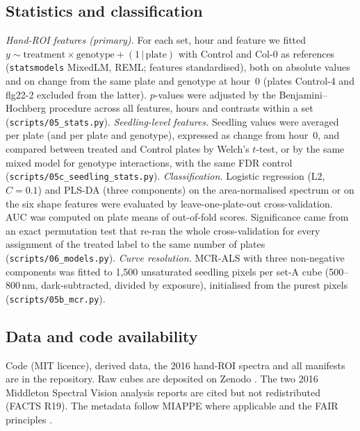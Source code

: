 \subsection{Statistics and classification}
\emph{Hand-ROI features (primary).} For each set, hour and feature we fitted
$y \sim \mathrm{treatment}\times\mathrm{genotype} + (1\,|\,\mathrm{plate})$ with Control and Col-0 as
references (\texttt{statsmodels} MixedLM, REML; features standardised), both on absolute values and
on change from the same plate and genotype at hour~0 (plates Control-4 and flg22-2 excluded from
the latter). $p$-values were adjusted by the Benjamini--Hochberg procedure across all features,
hours and contrasts within a set \citep{benjamini1995} (\texttt{scripts/05\_stats.py}).
\emph{Seedling-level features.} Seedling values were averaged per plate (and per plate and
genotype), expressed as change from hour~0, and compared between treated and Control plates by
Welch's $t$-test, or by the same mixed model for genotype interactions, with the same FDR control
(\texttt{scripts/05c\_seedling\_stats.py}).
\emph{Classification.} Logistic regression (L2, $C=0.1$) and PLS-DA (three components) on the
area-normalised spectrum or on the six shape features were evaluated by leave-one-plate-out
cross-validation. AUC was computed on plate means of out-of-fold scores. Significance came from an
exact permutation test that re-ran the whole cross-validation for every assignment of the treated
label to the same number of plates (\texttt{scripts/06\_models.py}).
\emph{Curve resolution.} MCR-ALS with three non-negative components was fitted to 1,500 unsaturated
seedling pixels per set-A cube (500--800\,nm, dark-subtracted, divided by exposure), initialised
from the purest pixels (\texttt{scripts/05b\_mcr.py}).

\subsection{Data and code availability}
Code (MIT licence), derived data, the 2016 hand-ROI spectra and all manifests are in the
repository. Raw cubes are deposited on Zenodo . The two 2016 Middleton Spectral Vision
analysis reports \citep{msv2016july,msv2017nov} are cited but not redistributed (FACTS R19). The metadata follow MIAPPE where
applicable \citep{papoutsoglou2020} and the FAIR principles \citep{wilkinson2016}.
